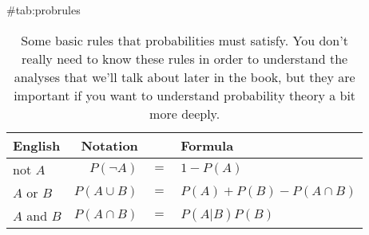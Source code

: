 \begin{table}
\caption{Some basic rules that probabilities must satisfy. You don't really need to know these rules in order to understand the analyses that we'll talk about later in the book, but they are important if you want to understand probability theory a bit more deeply.}\tabcapsep
{#tab:probrules}
\begin{center}
\begin{tabular}{lrcl}
English & Notation & & Formula \\ \hline
not $A$ & $P(\neg A)$ &$=$& $1-P(A)$ \\
$A$ or $B$ & $P(A \cup B)$ &$=$& $P(A) + P(B) - P(A \cap B)$ \\
$A$ and $B$ & $P(A \cap B)$ &$=$& $P(A|B) P(B)$ \\
\end{tabular}
\tabcapsep \HR
\end{center}
\end{table}




